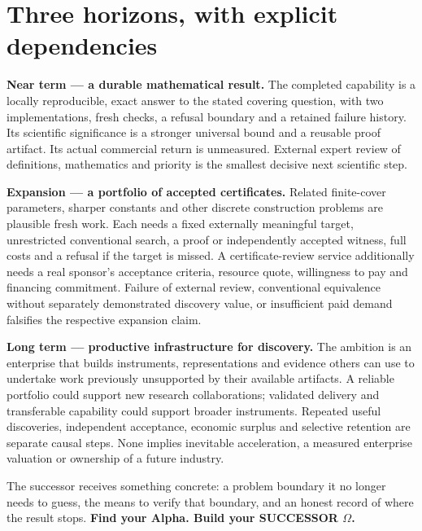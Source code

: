 \documentclass[11pt,a4paper]{article}
\begin{document}

\hypertarget{three-horizons-with-explicit-dependencies}{%
\section{Three horizons, with explicit
dependencies}\label{three-horizons-with-explicit-dependencies}}

\textbf{Near term --- a durable mathematical result.} The completed
capability is a locally reproducible, exact answer to the stated
covering question, with two implementations, fresh checks, a refusal
boundary and a retained failure history. Its scientific significance is
a stronger universal bound and a reusable proof artifact. Its actual
commercial return is unmeasured. External expert review of definitions,
mathematics and priority is the smallest decisive next scientific step.

\textbf{Expansion --- a portfolio of accepted certificates.} Related
finite-cover parameters, sharper constants and other discrete
construction problems are plausible fresh work. Each needs a fixed
externally meaningful target, unrestricted conventional search, a proof
or independently accepted witness, full costs and a refusal if the
target is missed. A certificate-review service additionally needs a real
sponsor's acceptance criteria, resource quote, willingness to pay and
financing commitment. Failure of external review, conventional
equivalence without separately demonstrated discovery value, or
insufficient paid demand falsifies the respective expansion claim.

\textbf{Long term --- productive infrastructure for discovery.} The
ambition is an enterprise that builds instruments, representations and
evidence others can use to undertake work previously unsupported by
their available artifacts. A reliable portfolio could support new
research collaborations; validated delivery and transferable capability
could support broader instruments. Repeated useful discoveries,
independent acceptance, economic surplus and selective retention are
separate causal steps. None implies inevitable acceleration, a measured
enterprise valuation or ownership of a future industry.

The successor receives something concrete: a problem boundary it no
longer needs to guess, the means to verify that boundary, and an honest
record of where the result stops. \textbf{Find your Alpha. Build your
SUCCESSOR \(\Omega\).}

\clearpage
\end{document}

